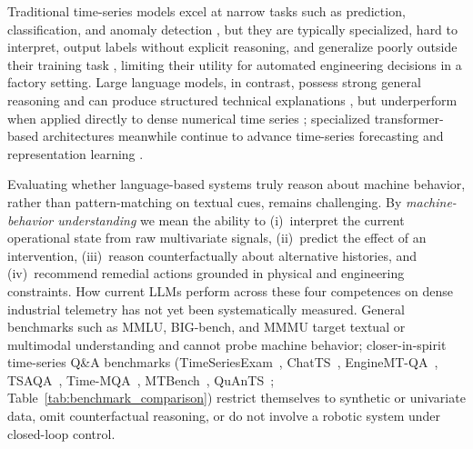 Traditional time-series models excel at narrow tasks such as prediction, classification, and anomaly detection \cite{zhou2021informer,su2019omni,audibert2020usad}, but they are typically specialized, hard to interpret, output labels without explicit reasoning, and generalize poorly outside their training task \cite{chalapathy2019survey,lavin2015numenta,zeng2023transformers}, limiting their utility for automated engineering decisions in a factory setting. Large language models, in contrast, possess strong general reasoning and can produce structured technical explanations \cite{wei2022chain,yao2023tree}, but underperform when applied directly to dense numerical time series \cite{gruver2023llmtime,jin2024timellm}; specialized transformer-based architectures meanwhile continue to advance time-series forecasting and representation learning \cite{vaswani2017attention,zhou2021informer,wu2021autoformer,zhou2022fedformer,nie2022time,ansari2024chronos,das2024decoder,petersen2026hepaselfsupervisedhorizonconditionedevent}.

Evaluating whether language-based systems truly reason about machine behavior, rather than pattern-matching on textual cues, remains challenging. By \emph{machine-behavior understanding} we mean the ability to (i)~interpret the current operational state from raw multivariate signals, (ii)~predict the effect of an intervention, (iii)~reason counterfactually about alternative histories, and (iv)~recommend remedial actions grounded in physical and engineering constraints. How current LLMs perform across these four competences on dense industrial telemetry has not yet been systematically measured. General benchmarks such as MMLU, BIG-bench, and MMMU \cite{hendrycks2021mmlu,srivastava2023bigbench,yue2024mmmu} target textual or multimodal understanding and cannot probe machine behavior; closer-in-spirit time-series Q\&A benchmarks (TimeSeriesExam~\cite{cai2024timeseriesexamtimeseriesunderstanding}, ChatTS~\cite{Xie_2025}, EngineMT-QA~\cite{wang2025itformerbridgingtimeseries}, TSAQA~\cite{jing2026tsaqatimeseriesanalysis}, Time-MQA~\cite{kong2025timemqatimeseriesmultitask}, MTBench~\cite{chen2026mtbenchmultimodaltimeseries}, QuAnTS~\cite{wenkel2024quants}; Table~\ref{tab:benchmark_comparison}) restrict themselves to synthetic or univariate data, omit counterfactual reasoning, or do not involve a robotic system under closed-loop control.

